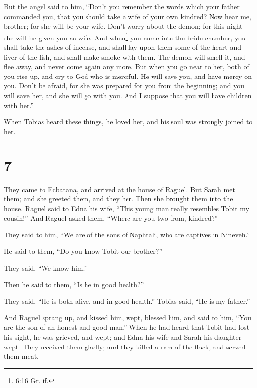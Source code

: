  But the angel said to him, ``Don't you remember the words
which your father commanded you, that you should take a wife of your own
kindred? Now hear me, brother; for she will be your wife. Don't worry
about the demon; for this night she will be given you as wife.
 And when\footnote{6:16 Gr. if.} you come into the
bride-chamber, you shall take the ashes of incense, and shall lay upon
them some of the heart and liver of the fish, and shall make smoke with
them.  The demon will smell it, and flee away, and never
come again any more. But when you go near to her, both of you rise up,
and cry to God who is merciful. He will save you, and have mercy on you.
Don't be afraid, for she was prepared for you from the beginning; and
you will save her, and she will go with you. And I suppose that you will
have children with her.''

When Tobias heard these things, he loved her, and his soul was strongly
joined to her.

\hypertarget{section-6}{%
\section{7}\label{section-6}}

 They came to Ecbatana, and arrived at the house of Raguel.
But Sarah met them; and she greeted them, and they her. Then she brought
them into the house.  Raguel said to Edna his wife, ``This
young man really resembles Tobit my cousin!''  And Raguel
asked them, ``Where are you two from, kindred?''

They said to him, ``We are of the sons of Naphtali, who are captives in
Nineveh.''

 He said to them, ``Do you know Tobit our brother?''

They said, ``We know him.''

Then he said to them, ``Is he in good health?''

 They said, ``He is both alive, and in good health.'' Tobias
said, ``He is my father.''

 And Raguel sprang up, and kissed him, wept, 
blessed him, and said to him, ``You are the son of an honest and good
man.'' When he had heard that Tobit had lost his sight, he was grieved,
and wept;  and Edna his wife and Sarah his daughter wept.
They received them gladly; and they killed a ram of the flock, and
served them meat.

